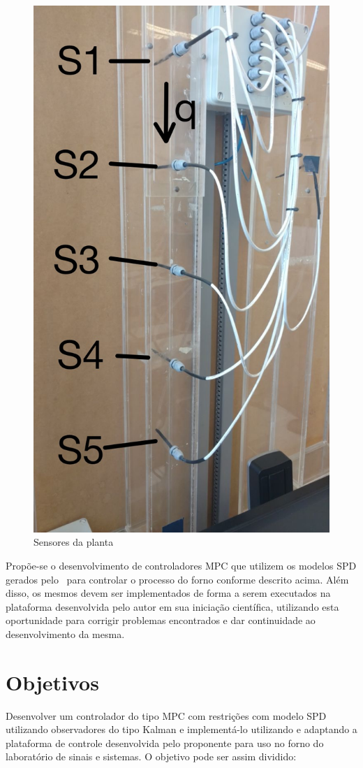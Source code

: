 \begin{figure}[ht!]
    \centering
    \captionsetup{justification=centering}
    \includegraphics[height=0.5\linewidth]{imgs/planta-spd}
    \caption{Sensores da planta}%
    \label{fig:sensors-SPD}
\end{figure}

Propõe-se o desenvolvimento de controladores \ac{MPC} que utilizem os modelos
\ac{SPD} gerados pelo~\textcite{masterthesis:nelson} para controlar o processo
do forno conforme descrito acima. Além disso, os mesmos devem ser implementados
de forma a serem executados na plataforma desenvolvida pelo autor em sua
iniciação científica, utilizando esta oportunidade para corrigir problemas
encontrados e dar continuidade ao desenvolvimento da mesma.

\section{Objetivos}%
\label{sec:objectives}

Desenvolver um controlador do tipo \ac{MPC} com restrições com modelo \ac{SPD}
utilizando observadores do tipo Kalman e implementá-lo utilizando e adaptando a
plataforma de controle desenvolvida pelo proponente para uso no forno do
laboratório de sinais e sistemas. O objetivo pode ser assim dividido:

